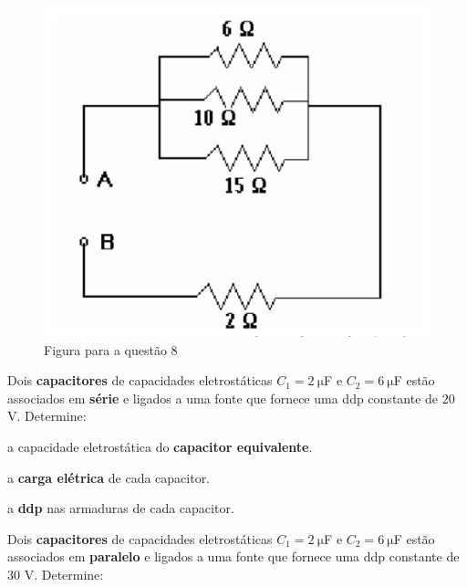 \documentclass{yagoexam}
\begin{document}
\begin{questions}
		
		\begin{figure}[H]
			\label{figq8}
			\caption{Figura para a questão 8}
			\begin{center}
				\includegraphics[scale=1]{imgs/q8.PNG}
			\end{center}
		\end{figure}
		
		\newpage
		
		
		\question[10]
		Dois \textbf{capacitores} de capacidades eletrostáticas $C_1 = 2 \ \si{\micro}$F e $C_2 = 6 \ \si{\micro}$F estão associados em \textbf{série} e ligados a uma fonte que fornece uma ddp constante de $20$ V. Determine: \\
		
		\begin{parts}
			
			\item a capacidade eletrostática do \textbf{capacitor equivalente}.
			\vspace{2.2cm}
			
			\item a \textbf{carga elétrica} de cada capacitor.
			\vspace{2.2cm}
			
			\item a \textbf{ddp} nas armaduras de cada capacitor.
			\vspace{3.2cm}
			
		\end{parts}
		
		
		\question[10]
		Dois \textbf{capacitores} de capacidades eletrostáticas $C_1 = 2 \ \si{\micro}$F e $C_2 = 6 \ \si{\micro}$F estão associados em \textbf{paralelo} e ligados a uma fonte que fornece uma ddp constante de $30$ V. Determine: \\
		

\end{questions}
\end{document}
